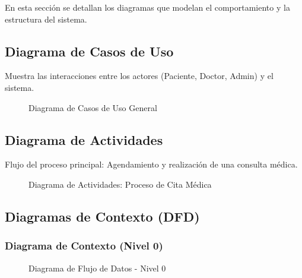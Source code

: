 \documentclass[12pt, a4paper]{article}
\begin{document}
	En esta sección se detallan los diagramas que modelan el comportamiento y la estructura del sistema.
	
	\subsection{Diagrama de Casos de Uso}
	Muestra las interacciones entre los actores (Paciente, Doctor, Admin) y el sistema.
	\begin{figure}[H]
		\centering
		\caption{Diagrama de Casos de Uso General}
	\end{figure}
	
	\subsection{Diagrama de Actividades}
	Flujo del proceso principal: Agendamiento y realización de una consulta médica.
	\begin{figure}[H]
		\centering
		\caption{Diagrama de Actividades: Proceso de Cita Médica}
	\end{figure}
	
	\subsection{Diagramas de Contexto (DFD)}
	
	\subsubsection{Diagrama de Contexto (Nivel 0)}
	\begin{figure}[H]
		\centering
		\caption{Diagrama de Flujo de Datos - Nivel 0}
	\end{figure}
	
\end{document}
